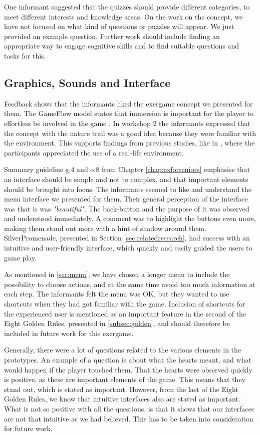 One informant suggested that the quizzes should provide different categories, to meet different interests and knowledge areas. On the work on the concept, we have not focused on what kind of questions or puzzles will appear. We just provided an example question. Further work should include finding an appropriate way to engage cognitive skills and to find suitable questions and tasks for this. 

\subsection{Graphics, Sounds and Interface}

Feedback shows that the informants liked the exergame concept we presented for them. The GameFlow model states that immersion is important for the player to effortless be involved in the game \cite{sweetser}. In workshop 2 the informants expressed that the concept with the nature trail was a good idea because they were familiar with the environment. This supports findings from previous studies, like in \cite{gerling2}, where the participants appreciated the use of a real-life environment.  

Summary guideline g.4 and o.8 from Chapter \ref{chap:exforseniors} emphasise that an interface should be simple and not to complex, and that important elements should be brought into focus. The informants seemed to like and understand the menu interface we presented for them. Their general perception of the interface was that is was \emph{"beautiful"}. The back-button and the purpose of it was observed and understood immediately. A comment was to highlight the buttons even more, making them stand out more with a hint of shadow around them. SilverPromenade, presented in Section \ref{sec:relatedresearch}, had success with an intuitive and user-friendly interface, which quickly and easily guided the users to game play. 

As mentioned in \ref{sec:menu}, we have chosen a longer menu to include the possibility to choose actions, and at the same time avoid too much information at each step. The informants felt the menu was OK, but they wanted to use shortcuts when they had got familiar with the game. Inclusion of shortcuts for the experienced user is mentioned as an important feature in the second of the Eight Golden Rules, presented in \ref{subsec:golden}, and should therefore be included in future work for this exergame.

Generally, there were a lot of questions related to the various elements in the prototypes. An example of a question is about what the hearts meant, and what would happen if the player touched them. That the hearts were observed quickly is positive, as these are important elements of the game. This means that they stand out, which is stated as important. However, from the last of the Eight Golden Rules, we know that intuitive interfaces also are stated as important. What is not so positive with all the questions, is that it shows that our interfaces are not that intuitive as we had believed. This has to be taken into consideration for future work. 

